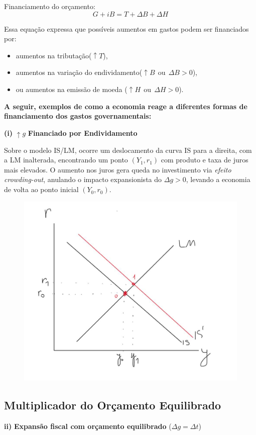 \documentclass[a4paper,12pt]{article}[abntex2]
\begin{document}
Financiamento do orçamento:
\[
G + iB = T + \Delta B + \Delta H
\]

Essa equação expressa que possíveis aumentos em gastos podem ser financiados por:
\begin{itemize}
    \item aumentos na tributação(\(\uparrow T\)),
    \item aumentos na variação do endividamento(\(\uparrow B \ \ \text{ou}\ \ \Delta B>0\)),
    \item ou aumentos na emissão de moeda (\(\uparrow H \ \ \text{ou}\ \ \Delta H>0\)).
\end{itemize}

\textbf{A seguir, exemplos de como a economia reage a diferentes formas de financiamento dos gastos governamentais:}

\textbf{(i)} $\uparrow g$ \quad \textbf{Financiado por Endividamento}

    Sobre o modelo IS/LM, ocorre um deslocamento da curva IS para a direita, com a LM inalterada, encontrando um ponto $(Y_1, r_1)$ com produto e taxa de juros mais elevados. O aumento nos juros gera queda no investimento via \textit{efeito crowding-out}, anulando o impacto expansionista do $\Delta g > 0$, levando a economia de volta ao ponto inicial $(Y_0, r_0)$.

\begin{figure}[H]
    \centering
    \includegraphics[width=0.7\linewidth]{Imagens/a18i1.png}
\end{figure}

\subsection{\textbf{Multiplicador do Orçamento Equilibrado}}
\textbf{ii)} \textbf{Expansão fiscal com orçamento equilibrado} ($\Delta g = \Delta t$)
\end{document}
